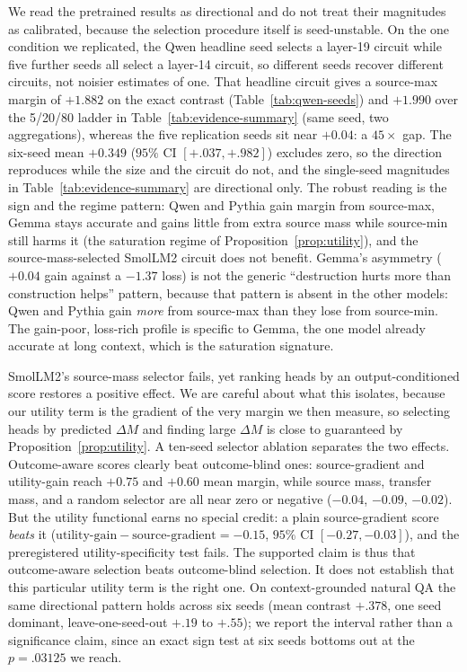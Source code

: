 \documentclass{article}
\begin{document}
We read the pretrained results as directional and do not treat their magnitudes as calibrated, because the
selection procedure itself is seed-unstable. On the one condition we replicated, the Qwen headline seed selects a layer-19 circuit while five
further seeds all select a layer-14 circuit, so different seeds recover different circuits, not noisier
estimates of one. That headline circuit gives a source-max margin of $+1.882$ on the exact contrast
(Table~\ref{tab:qwen-seeds}) and $+1.990$ over the 5/20/80 ladder in Table~\ref{tab:evidence-summary} (same
seed, two aggregations), whereas the five replication seeds sit near $+0.04$: a $45\times$ gap. The six-seed
mean $+0.349$ ($95\%$ CI $[+.037,+.982]$) excludes zero, so the direction reproduces while the size and the
circuit do not, and the single-seed magnitudes in Table~\ref{tab:evidence-summary} are directional only. The
robust reading is the sign and the regime pattern: Qwen and Pythia gain margin from source-max, Gemma stays
accurate and gains little from extra source mass while source-min still harms it (the saturation regime of
Proposition~\ref{prop:utility}), and the source-mass-selected SmolLM2 circuit does not benefit. Gemma's
asymmetry ($+0.04$ gain against a $-1.37$ loss) is not the generic ``destruction hurts more than construction
helps'' pattern, because that pattern is absent in the other models: Qwen and Pythia gain \emph{more} from
source-max than they lose from source-min. The gain-poor, loss-rich profile is specific to Gemma, the one model
already accurate at long context, which is the saturation signature.

SmolLM2's source-mass selector fails, yet ranking heads by an output-conditioned score restores a positive
effect. We are careful about what this isolates, because our utility term is the gradient of the very margin we
then measure, so selecting heads by predicted $\Delta M$ and finding large $\Delta M$ is close to guaranteed by
Proposition~\ref{prop:utility}. A ten-seed selector ablation separates the two effects. Outcome-aware scores
clearly beat outcome-blind ones: source-gradient and utility-gain reach $+0.75$ and $+0.60$ mean margin, while
source mass, transfer mass, and a random selector are all near zero or negative ($-0.04$, $-0.09$, $-0.02$).
But the utility functional earns no special credit: a plain source-gradient score \emph{beats} it
($\text{utility-gain} - \text{source-gradient} = -0.15$, $95\%$ CI $[-0.27,-0.03]$), and the preregistered
utility-specificity test fails. The supported claim is thus that outcome-aware selection beats outcome-blind
selection. It does not establish that this particular utility term is the right one. On context-grounded
natural QA the same
directional pattern holds across six seeds (mean contrast $+.378$, one seed dominant, leave-one-seed-out $+.19$
to $+.55$); we report the interval rather than a significance claim, since an exact sign test at six seeds
bottoms out at the $p=.03125$ we reach.
\end{document}
